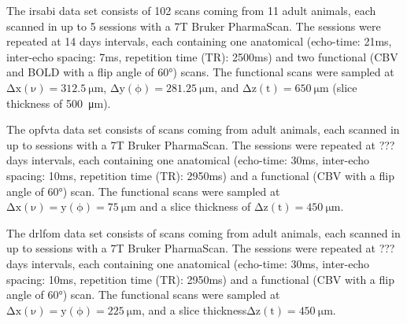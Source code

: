 The irsabi data set consists of 102 scans coming from 11 adult animals, each scanned in up to 5 sessions with a 7T Bruker PharmaScan.
The sessions were repeated at 14 days intervals, each containing one anatomical (echo-time: 21ms, inter-echo spacing: 7ms, repetition time (TR): 2500ms) and two functional (CBV and BOLD with a flip angle of 60°) scans.
The functional scans were sampled at $\mathrm{\Delta x(\nu)=\SI{312.5}{\micro\meter}}$, $\mathrm{\Delta y(\phi)=\SI{281.25}{\micro\meter}}$, and $\mathrm{\Delta z(t)=\SI{650}{\micro\meter}}$ (slice thickness of \SI{500}{\micro\meter}).

The opfvta data set consists of  scans coming from  adult animals, each scanned in up to  sessions with a 7T Bruker PharmaScan.
The sessions were repeated at ??? days intervals, each containing one anatomical (echo-time: 30ms, inter-echo spacing: 10ms, repetition time (TR): 2950ms) and a functional (CBV with a flip angle of 60°) scan.
The functional scans were sampled at $\mathrm{\Delta x(\nu)=y(\phi)=\SI{75}{\micro\meter}}$ and a slice thickness of $\mathrm{\Delta z(t)=\SI{450}{\micro\meter}}$.

The drlfom data set consists of  scans coming from  adult animals, each scanned in up to  sessions with a 7T Bruker PharmaScan.
The sessions were repeated at ??? days intervals, each containing one anatomical (echo-time: 30ms, inter-echo spacing: 10ms, repetition time (TR): 2950ms) and a functional (CBV with a flip angle of 60°) scan.
The functional scans were sampled at $\mathrm{\Delta x(\nu)=y(\phi)=\SI{225}{\micro\meter}}$, and a slice thickness$\mathrm{\Delta z(t)=\SI{450}{\micro\meter}}$.

